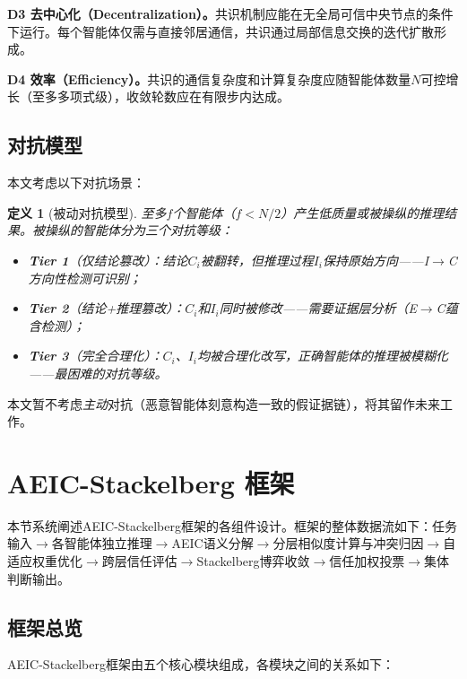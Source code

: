 \documentclass[12pt,a4paper,UTF8,fontset=fandol]{ctexart}
\newtheorem{definition}{定义}[section]
\begin{document}
\textbf{D3 去中心化（Decentralization）。}共识机制应能在无全局可信中央节点的条件下运行。每个智能体仅需与直接邻居通信，共识通过局部信息交换的迭代扩散形成。

\textbf{D4 效率（Efficiency）。}共识的通信复杂度和计算复杂度应随智能体数量$N$可控增长（至多多项式级），收敛轮数应在有限步内达成。

\subsection{对抗模型}

本文考虑以下对抗场景：

\begin{definition}[被动对抗模型]\label{def:adversary}
至多$f$个智能体（$f < N/2$）产生低质量或被操纵的推理结果。被操纵的智能体分为三个对抗等级：
\begin{itemize}[nosep]
    \item \textbf{Tier 1}（仅结论篡改）：结论$C_i$被翻转，但推理过程$I_i$保持原始方向——I$\to$C方向性检测可识别；
    \item \textbf{Tier 2}（结论+推理篡改）：$C_i$和$I_i$同时被修改——需要证据层分析（E$\to$C蕴含检测）；
    \item \textbf{Tier 3}（完全合理化）：$C_i$、$I_i$均被合理化改写，正确智能体的推理被模糊化——最困难的对抗等级。
\end{itemize}
\end{definition}

本文暂不考虑\textit{主动}对抗（恶意智能体刻意构造一致的假证据链），将其留作未来工作。

\section{AEIC-Stackelberg 框架}\label{sec:framework}

本节系统阐述AEIC-Stackelberg框架的各组件设计。框架的整体数据流如下：任务输入$\to$各智能体独立推理$\to$AEIC语义分解$\to$分层相似度计算与冲突归因$\to$自适应权重优化$\to$跨层信任评估$\to$Stackelberg博弈收敛$\to$信任加权投票$\to$集体判断输出。

\subsection{框架总览}

AEIC-Stackelberg框架由五个核心模块组成，各模块之间的关系如下：
\end{document}
